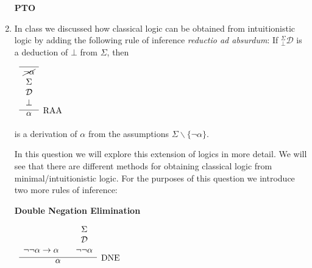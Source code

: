 \documentclass[11pt]{report}
\begin{document}
\begin{enumerate}
\begin{enumerate}
	\end{enumerate}
	
	\vfill
	\hfill \textbf{PTO}
	\newpage
	
	\item In class we discussed how classical logic can be obtained from intuitionistic logic by adding the following rule of inference \emph{reductio ad absurdum}: If $^{\Sigma}_{\bot}\mathcal{D}$ is a deduction of $\bot$ from $\Sigma$, then
	
	\begin{center}		
		$\begin{array}{c}		
		\infer[\text{RAA}]{\alpha}
		{\begin{array}{c} \hline \cancel{\lnot\alpha} \\ \Sigma \\ \mathcal{D} \\ \bot \end{array}}
		\end{array}$
	\end{center}
	
	is a derivation of $\alpha$ from the assumptions $\Sigma \backslash\{\lnot\alpha\}$.

	In this question we will explore this extension of logics in more detail. We will see that there are different methods for obtaining classical logic from minimal/intuitionistic logic.	For the purposes of this question we introduce two more rules of inference: 

	\begin{center}
		\begin{minipage}{0.45\textwidth}
		\centering

			\textbf{Double Negation Elimination}

			$\begin{array}{ c }
			\infer[\text{DNE}]{\alpha}
			{
			\begin{array}{c} \  \\ \ \\ \lnot \lnot\alpha \to \alpha \end{array}
			& 
			\begin{array}{c} \Sigma  \\ \mathcal{D} \\ \lnot \lnot\alpha \end{array}							 
			}
			\end{array}$
		\end{minipage}%
	\hfill
		\begin{minipage}{0.45\textwidth}
		\centering


\end{minipage}
\end{center}
\end{enumerate}
\end{document}
